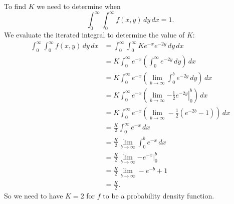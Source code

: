 \begin{activitySolution}
\item To find $K$ we need to determine when 
\[\int_0^{\infty} \int_0^{\infty} f(x,y) \, dy \, dx = 1.\]
We evaluate the iterated integral to determine the value of $K$:
\begin{align*}
\int_0^{\infty} \int_0^{\infty} f(x,y) \, dy \, dx &= \int_0^{\infty} \int_0^{\infty} Ke^{-x} e^{-2y} \, dy \, dx \\
	&= K\int_0^{\infty} e^{-x} \left( \int_0^{\infty}  e^{-2y} \, dy \right) \, dx \\
	&= K\int_0^{\infty} e^{-x} \left(\lim_{b \to \infty} \int_0^{b}  e^{-2y} \, dy \right) \, dx \\
	&= K\int_0^{\infty} e^{-x} \left(\lim_{b \to \infty} \left. -\frac{1}{2}e^{-2y} \right|_0^{b} \right) \, dx \\
	&= K\int_0^{\infty} e^{-x} \left(\lim_{b \to \infty} -\frac{1}{2}(e^{-2b}-1) \right) \, dx \\
	&= \frac{K}{2}\int_0^{\infty} e^{-x}  \, dx \\
	&= \frac{K}{2}\lim_{b \to \infty} \int_0^{b}  e^{-x} \, dx \\
	&= \frac{K}{2}\lim_{b \to \infty} \left. -e^{-x} \right|_0^{b} \\
	&= \frac{K}{2}\lim_{b \to \infty} -e^{-b}+1 \\
	&= \frac{K}{2}.
\end{align*}
So we need to have $K = 2$ for $f$ to be a probability density function.

\ea
\end{activitySolution}
\aftera



